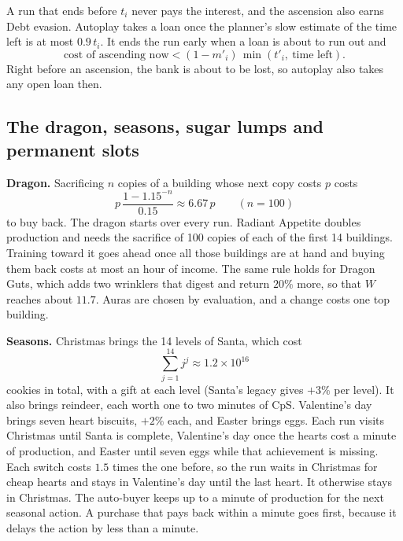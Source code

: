 \documentclass[11pt,a4paper]{article}
\numberwithin{equation}{section}
\theoremstyle{definition}
\theoremstyle{remark}
\newcommand{\proofstep}[1]{\par\addvspace{\medskipamount}\noindent\textbf{#1}\enspace\ignorespaces}
\begin{document}
A run that ends before $t_i$ never pays the interest, and the ascension also earns Debt evasion. Autoplay takes a loan once the planner's slow estimate of the time left is at most $0.9\,t_i$. It ends the run early when a loan is about to run out and
\begin{equation}\label{eq:loan-exit}
 \text{cost of ascending now}<(1-m'_i)\,\min(t'_i,\ \text{time left}).
\end{equation}
Right before an ascension, the bank is about to be lost, so autoplay also takes any open loan then.

\subsection{The dragon, seasons, sugar lumps and permanent slots}\label{sec:other}
\proofstep{Dragon.} Sacrificing $n$ copies of a building whose next copy costs $p$ costs
\begin{equation}\label{eq:rebuy}
 p\,\frac{1-1.15^{-n}}{0.15}\approx6.67\,p\qquad(n=100)
\end{equation}
to buy back. The dragon starts over every run. Radiant Appetite doubles production and needs the sacrifice of 100 copies of each of the first 14 buildings. Training toward it goes ahead once all those buildings are at hand and buying them back costs at most an hour of income. The same rule holds for Dragon Guts, which adds two wrinklers that digest and return $20\%$ more, so that $W$ reaches about $11.7$. Auras are chosen by evaluation, and a change costs one top building.

\proofstep{Seasons.} Christmas brings the 14 levels of Santa, which cost
\begin{equation}\label{eq:santa}
 \sum_{j=1}^{14}j^j\approx1.2\times10^{16}
\end{equation}
cookies in total, with a gift at each level (Santa's legacy gives $+3\%$ per level). It also brings reindeer, each worth one to two minutes of CpS. Valentine's day brings seven heart biscuits, $+2\%$ each, and Easter brings eggs. Each run visits Christmas until Santa is complete, Valentine's day once the hearts cost a minute of production, and Easter until seven eggs while that achievement is missing. Each switch costs $1.5$ times the one before, so the run waits in Christmas for cheap hearts and stays in Valentine's day until the last heart. It otherwise stays in Christmas. The auto-buyer keeps up to a minute of production for the next seasonal action. A purchase that pays back within a minute goes first, because it delays the action by less than a minute.
\end{document}
